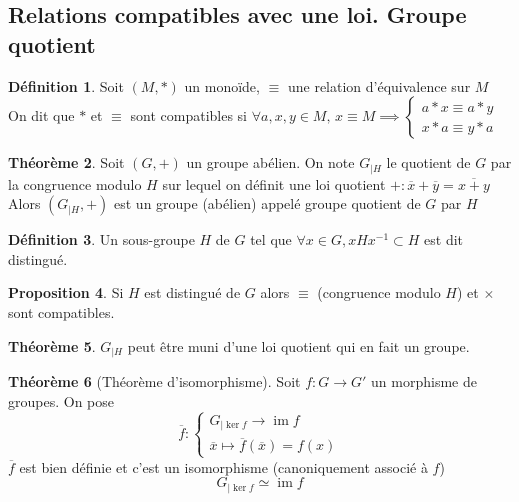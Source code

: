 \documentclass[10pt,a4paper]{article}
\theoremstyle{definition}
\newtheorem{proposition}{Proposition}[section]
\newtheorem{theorem}[proposition]{Théorème}
\newtheorem{definition}[proposition]{Définition}
\DeclareMathOperator{\im}{im}
\begin{document}
\subsection{Relations compatibles avec une loi. Groupe quotient}
\begin{definition}
Soit $(M, *)$ un monoïde, $\equiv$ une relation d'équivalence sur $M$ \\
On dit que $*$ et $\equiv$ sont compatibles si $\forall a, x, y \in M ,\, x \equiv M \implies \begin{cases}
 a * x \equiv a * y \\
 x * a \equiv y * a
\end{cases}$
\end{definition}
\begin{theorem}
Soit $(G, +)$ un groupe abélien. On note $G_{|H}$ le quotient de $G$ par la congruence modulo $H$ sur lequel on définit une loi quotient $+ : \overline{x} + \overline{y} = \overline{x + y}$ \\
Alors $(G_{|H}, +)$ est un groupe (abélien) appelé groupe quotient de $G$ par $H$ 
\end{theorem}
\begin{definition}
Un sous-groupe $H$ de $G$ tel que $\forall x \in G, x H x^{-1} \subset H$ est dit distingué.
\end{definition}
\begin{proposition}
Si $H$ est distingué de $G$ alors $\equiv$ (congruence modulo $H$) et $\times$ sont compatibles.
\end{proposition}
\begin{theorem}
$G_{|H}$ peut être muni d'une loi quotient qui en fait un groupe.
\end{theorem}
\begin{theorem}[Théorème d'isomorphisme]
Soit $f: G \to G'$ un morphisme de groupes. On pose
\[ \overline{f} : \begin{cases}
G_{|\ker f} \to \im f \\
\overline{x} \mapsto \overline{f}(\overline{x}) = f(x)
\end{cases} \]
$\overline{f}$ est bien définie et c'est un isomorphisme (canoniquement associé à $f$)
\[ G_{|\ker f} \simeq \im f\]
\end{theorem}
\end{document}
